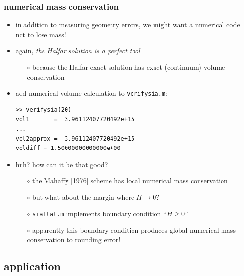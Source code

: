 \begin{frame}[fragile]
\frametitle{numerical mass conservation}

\begin{itemize}
\item in addition to measuring geometry errors, we might want a numerical code not to lose mass!
\item again, \emph{the Halfar solution is a perfect tool}
  \begin{itemize}
  \item[$\circ$] because the Halfar exact solution has exact (continuum) volume conservation
  \end{itemize}
\item add numerical volume calculation to \texttt{verifysia.m}:
\small
\begin{verbatim}
>> verifysia(20)
vol1       =  3.96112407720492e+15
...
vol2approx =  3.96112407720492e+15
voldiff = 1.50000000000000e+00
\end{verbatim}
\normalsize
\item huh?  how can it be that good?
  \begin{itemize}
  \item[$\circ$] the Mahaffy [1976]\nocite{Mahaffy} scheme has local numerical mass conservation
  \item[$\circ$] but what about the margin where $H\to 0$?
  \item[$\circ$] \texttt{siaflat.m} implements boundary condition \quad ``$H\ge 0$''
  \item[$\circ$] apparently this boundary condition produces global numerical mass conservation to rounding error!
  \end{itemize}
\end{itemize}
\end{frame}


\subsection{application}

